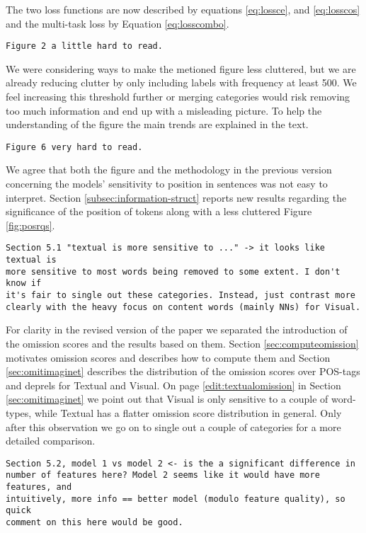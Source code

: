 \documentclass{article}
\begin{document}
The two loss functions are now described by equations \ref{eq:lossce}, and 
\ref{eq:losscos} and the multi-task loss by Equation \ref{eq:losscombo}.


\begin{verbatim}
Figure 2 a little hard to read.
\end{verbatim}

We were considering ways to make the metioned figure less cluttered, but
we are already reducing clutter by
only including labels with frequency at least 500. We feel increasing
this threshold further or merging categories would risk 
removing too much information and end up with a misleading picture. 
To help the understanding of the figure the main trends are explained in the text.

\begin{verbatim}
Figure 6 very hard to read.
\end{verbatim}

We agree that both the figure and the methodology in the previous
version concerning the models' sensitivity to position in
sentences was  not easy to interpret. Section 
\ref{subsec:information-struct} reports new results 
regarding the significance of the position of tokens along
with a less cluttered Figure \ref{fig:posrqs}.

\begin{verbatim}
Section 5.1 "textual is more sensitive to ..." -> it looks like textual is
more sensitive to most words being removed to some extent. I don't know if
it's fair to single out these categories. Instead, just contrast more
clearly with the heavy focus on content words (mainly NNs) for Visual.
\end{verbatim}

For clarity in the revised version of the paper we separated the
introduction of the omission scores and the results based on them. 
Section \ref{sec:computeomission} motivates omission scores and describes
how to compute them and Section \ref{sec:omitimaginet} describes the
distribution of the omission scores over POS-tags and deprels for 
{\sc Textual} and {\sc Visual}. On page \ref{edit:textualomission} 
in Section \ref{sec:omitimaginet} we point out that {\sc Visual} is 
only sensitive to a couple of word-types, 
while {\sc Textual} has a flatter omission score distribution in general.
Only after this observation we go on to single out a couple of
categories for a more detailed comparison.

\begin{verbatim}
Section 5.2, model 1 vs model 2 <- is the a significant difference in
number of features here? Model 2 seems like it would have more features, and
intuitively, more info == better model (modulo feature quality), so quick
comment on this here would be good.
\end{verbatim}
\end{document}
